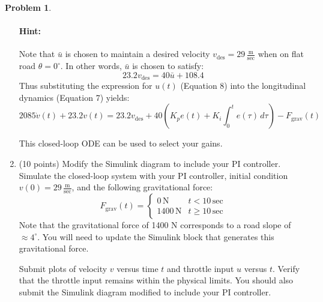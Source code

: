 \documentclass[12pt]{article}
\theoremstyle{definition}
\newtheorem{problem}{Problem}
\begin{document}
\begin{problem}
\begin{enumerate}[label=(\alph*)]
\paragraph{Hint:}
Note that \( \bar{u} \) is chosen to maintain a desired velocity \( v_{\text{des}} = 29 \, \frac{\text{m}}{\text{sec}} \) when on flat road \( \theta = 0^\circ \). In other words, \( \bar{u} \) is chosen to satisfy:
\[
23.2v_{\text{des}} = 40\bar{u} + 108.4
\]
Thus substituting the expression for \( u(t) \) (Equation 8) into the longitudinal dynamics (Equation 7) yields:
\[
2085 \dot{v}(t) + 23.2 v(t) = 23.2 v_{\text{des}} + 40 \left( K_p e(t) + K_i \int_0^t e(\tau) \, d\tau \right) - F_{\text{grav}}(t)
\]

This closed-loop ODE can be used to select your gains.

    \item (10 points) Modify the Simulink diagram to include your PI controller. Simulate the closed-loop system with your PI controller, initial condition \( v(0) = 29 \, \frac{\text{m}}{\text{sec}} \), and the following gravitational force:
    \[
    F_{\text{grav}}(t) = 
    \begin{cases} 
    0 \, \text{N} & t < 10 \, \text{sec} \\
    1400 \, \text{N} & t \geq 10 \, \text{sec}
    \end{cases}
    \]
    Note that the gravitational force of 1400 N corresponds to a road slope of \( \approx 4^\circ \). You will need to update the Simulink block that generates this gravitational force.

    Submit plots of velocity \( v \) versus time \( t \) and throttle input \( u \) versus \( t \). Verify that the throttle input remains within the physical limits. You should also submit the Simulink diagram modified to include your PI controller.
\end{enumerate}
\end{problem}


\end{document}
